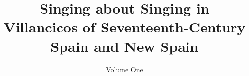 \documentclass{vcscores}
\begin{document}
\frontmatter

\begin{maintitle}
\title{Singing about Singing in Villancicos of Seventeenth-Century Spain and New Spain}
\subtitle{Volume One}
\editor{\myname}
\end{maintitle}

\copyrightpage

\tableofcontents*

\mainmatter


% 
% 
% 
\end{document}
